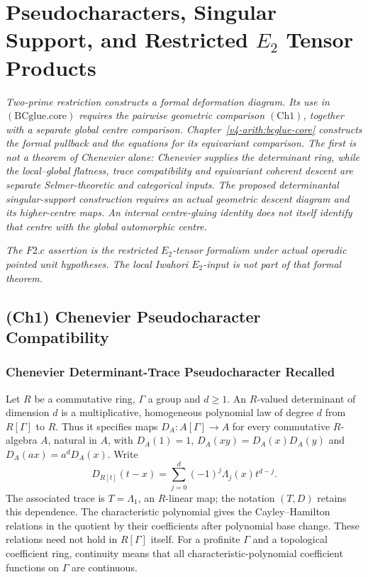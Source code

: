 \chapter{Pseudocharacters, Singular Support, and Restricted \(E_{2}\) Tensor Products}
\label{v4-arith:w5-h:bcglue-core-and-F2c}

\emph{Two-prime restriction constructs a formal deformation diagram.
Its use in \((\mathrm{BCglue.core})\) requires the pairwise geometric
comparison \((\mathrm{Ch1})\), together with a separate global
centre comparison. Chapter~\ref{v4-arith:bcglue-core} constructs the
formal pullback and the equations for its equivariant comparison. The first is not a theorem of Chenevier alone:
Chenevier supplies the determinant ring, while the local--global
flatness, trace compatibility and equivariant coherent descent are
separate Selmer-theoretic and categorical inputs. The proposed determinantal singular-support construction requires
an actual geometric descent diagram and its higher-centre maps.
An internal centre-gluing identity does not itself identify that
centre with the global automorphic centre.}

\emph{The \(F2.c\) assertion is the
restricted \(E_{2}\)-tensor formalism under actual operadic pointed
unit hypotheses. The local Iwahori \(E_{2}\)-input is not part of that
formal theorem.}

\section{(Ch1) Chenevier Pseudocharacter Compatibility}
\label{v4-arith:w5-h:ch1}

\subsection{Chenevier Determinant-Trace Pseudocharacter Recalled}

\begin{definition}
\label{v4-arith:w5-h:def:chenevier-det-trace}
Let $R$ be a commutative ring, $\Gamma$ a group and $d\geq1$.
An $R$-valued determinant of dimension $d$ is a multiplicative,
homogeneous polynomial law of degree $d$ from $R[\Gamma]$ to $R$.
Thus it specifies maps $D_A:A[\Gamma]\to A$ for every commutative
$R$-algebra $A$, natural in $A$, with
$D_A(1)=1$, $D_A(xy)=D_A(x)D_A(y)$ and
$D_A(ax)=a^dD_A(x)$. Write
\[
 D_{R[t]}(t-x)=\sum_{j=0}^d(-1)^j\Lambda_j(x)t^{d-j}.
\]
The associated trace is $T=\Lambda_1$, an $R$-linear map; the
notation $(T,D)$ retains this dependence. The characteristic
polynomial gives the Cayley--Hamilton relations in the quotient
by their coefficients after polynomial base change. These relations
need not hold in $R[\Gamma]$ itself.
For a profinite $\Gamma$ and a topological coefficient ring,
continuity means that all characteristic-polynomial coefficient
functions on $\Gamma$ are continuous.
\end{definition}

